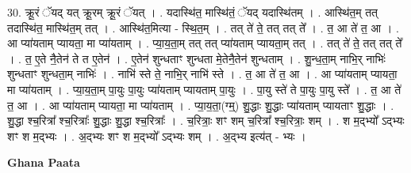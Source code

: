 \documentclass[17pt]{extarticle}
\begin{document}
30. क्रू॒रं ॅयद् यत् क्रू॒रम् क्रू॒रं ॅयत् । . यदास्थि॑त॒ मास्थि॑तं॒ ॅयद् यदास्थि॑तम् । . आस्थि॑त॒म् तत् तदास्थि॑त॒ मास्थि॑त॒म् तत् । . आस्थि॑त॒मित्या - स्थि॒त॒म् । . तत् ते॑ ते॒ तत् तत् ते᳚ । . त॒ आ ते॑ त॒ आ । . आ प्या॑यताम् प्यायता॒ मा प्या॑यताम् । . प्या॒य॒ता॒म् तत् तत् प्या॑यताम् प्यायता॒म् तत् । . तत् ते॑ ते॒ तत् तत् ते᳚ । . त॒ ए॒ते नै॒तेन॑ ते त ए॒तेन॑ । . ए॒तेन॑ शुन्धताꣳ शुन्धता मे॒तेनै॒तेन॑ शुन्धताम् । . शु॒न्ध॒ता॒म् नाभि॒र् नाभिः॑ शुन्धताꣳ शुन्धता॒म् नाभिः॑ । . नाभि॑ स्ते ते॒ नाभि॒र् नाभि॑ स्ते । . त॒ आ ते॑ त॒ आ । . आ प्या॑यताम् प्यायता॒ मा प्या॑यताम् । . प्या॒य॒ता॒म् पा॒युः पा॒युः प्या॑यताम् प्यायताम् पा॒युः । . पा॒यु स्ते॑ ते पा॒युः पा॒यु स्ते᳚ । . त॒ आ ते॑ त॒ आ । . आ प्या॑यताम् प्यायता॒ मा प्या॑यताम् । . प्या॒य॒ता॒(ग्म्॒) शु॒द्धाः शु॒द्धाः प्या॑यताम् प्यायताꣳ शु॒द्धाः । . शु॒द्धा श्च॒रित्रा᳚ श्च॒रित्राः᳚ शु॒द्धाः शु॒द्धा श्च॒रित्राः᳚ । . च॒रित्राः॒ शꣳ शम् च॒रित्रा᳚ श्च॒रित्राः॒ शम् । . श म॒द्भ्यो᳚ ऽद्भ्यः शꣳ श म॒द्भ्यः । . अ॒द्भ्यः शꣳ श म॒द्भ्यो᳚ ऽद्भ्यः शम् । . अ॒द्भ्य इत्य॑त् - भ्यः । \newline

\textbf{Ghana Paata } \newline
\end{document}
